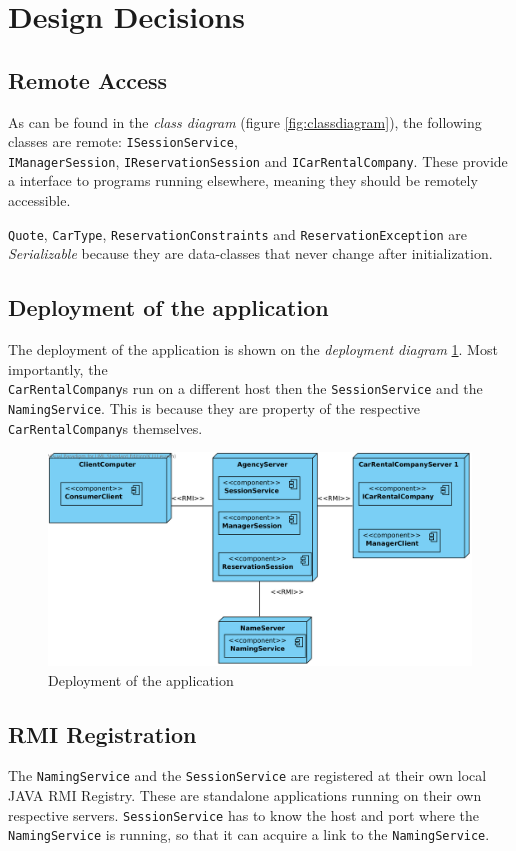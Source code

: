 \documentclass[a4paper]{article}
\begin{document}
\section{Design Decisions}

\subsection{Remote Access}
As can be found in the \emph{class diagram} (figure \ref{fig:classdiagram}), the following classes are remote: \texttt{ISessionService}, \\ \texttt{IManagerSession}, \texttt{IReservationSession} and \texttt{ICarRentalCompany}. These provide a interface to programs running elsewhere, meaning they should be remotely accessible. 

\texttt{Quote}, \texttt{CarType}, \texttt{ReservationConstraints} and \texttt{ReservationException} are \emph{Serializable} because they are data-classes that never change after initialization. 

\subsection{Deployment of the application}
The deployment of the application is shown on the \emph{deployment diagram} \ref{fig:deployment}.
Most importantly, the \\ \texttt{CarRentalCompany}s run on a different host then the \texttt{SessionService} and the \texttt{NamingService}. This is because they are property of the respective \texttt{CarRentalCompany}s themselves. 

\begin{figure}[hbtp]
\centering
\includegraphics[width=\textwidth]{img/Deployment Diagram.png}
\caption{Deployment of the application}
\label{fig:deployment}
\end{figure}
\subsection{RMI Registration}
The \texttt{NamingService} and the \texttt{SessionService} are registered at their own local JAVA RMI Registry. These are standalone applications running on their own respective servers. \texttt{SessionService} has to know the host and port where the \texttt{NamingService} is running, so that it can acquire a link to the \texttt{NamingService}.
\end{document}
